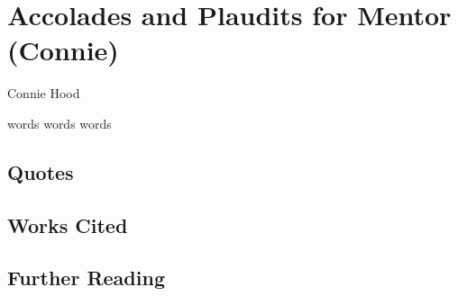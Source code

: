 \chapter{Accolades and Plaudits for Mentor (Connie)}

\begin{authors}
	Connie Hood
\end{authors}

words words words


\section{Quotes}

\section{Works Cited}

\section{Further Reading}


